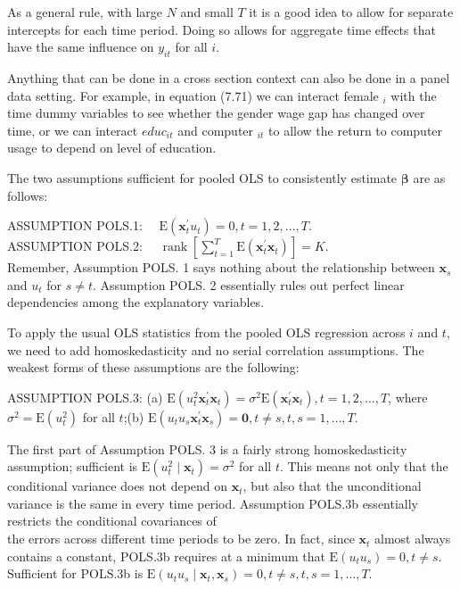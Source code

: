 \documentclass[10pt]{article}
\begin{document}
As a general rule, with large $N$ and small $T$ it is a good idea to allow for separate intercepts for each time period. Doing so allows for aggregate time effects that have the same influence on $y_{i t}$ for all $i$.

Anything that can be done in a cross section context can also be done in a panel data setting. For example, in equation (7.71) we can interact female ${ }_{i}$ with the time dummy variables to see whether the gender wage gap has changed over time, or we can interact $e d u c_{i t}$ and computer ${ }_{i t}$ to allow the return to computer usage to depend on level of education.

The two assumptions sufficient for pooled OLS to consistently estimate $\boldsymbol{\beta}$ are as follows:

ASSUMPTION POLS.1: $\quad \mathrm{E}\left(\mathbf{x}_{t}^{\prime} u_{t}\right)=0, t=1,2, \ldots, T$.\\
ASSUMPTION POLS.2: $\quad \operatorname{rank}\left[\sum_{t=1}^{T} \mathrm{E}\left(\mathbf{x}_{t}^{\prime} \mathbf{x}_{t}\right)\right]=K$.\\
Remember, Assumption POLS. 1 says nothing about the relationship between $\mathbf{x}_{s}$ and $u_{t}$ for $s \neq t$. Assumption POLS. 2 essentially rules out perfect linear dependencies among the explanatory variables.

To apply the usual OLS statistics from the pooled OLS regression across $i$ and $t$, we need to add homoskedasticity and no serial correlation assumptions. The weakest forms of these assumptions are the following:

ASSUMPTION POLS.3: (a) $\mathrm{E}\left(u_{t}^{2} \mathbf{x}_{t}^{\prime} \mathbf{x}_{t}\right)=\sigma^{2} \mathrm{E}\left(\mathbf{x}_{t}^{\prime} \mathbf{x}_{t}\right), t=1,2, \ldots, T$, where $\sigma^{2}=\mathrm{E}\left(u_{t}^{2}\right)$ for all $t$;(b) $\mathrm{E}\left(u_{t} u_{s} \mathbf{x}_{t}^{\prime} \mathbf{x}_{s}\right)=\mathbf{0}, t \neq s, t, s=1, \ldots, T$.

The first part of Assumption POLS. 3 is a fairly strong homoskedasticity assumption; sufficient is $\mathrm{E}\left(u_{t}^{2} \mid \mathbf{x}_{t}\right)=\sigma^{2}$ for all $t$. This means not only that the conditional variance does not depend on $\mathbf{x}_{t}$, but also that the unconditional variance is the same in every time period. Assumption POLS.3b essentially restricts the conditional covariances of\\
the errors across different time periods to be zero. In fact, since $\mathbf{x}_{t}$ almost always contains a constant, POLS.3b requires at a minimum that $\mathrm{E}\left(u_{t} u_{s}\right)=0, t \neq s$. Sufficient for POLS.3b is $\mathrm{E}\left(u_{t} u_{s} \mid \mathbf{x}_{t}, \mathbf{x}_{s}\right)=0, t \neq s, t, s=1, \ldots, T$.
\end{document}
